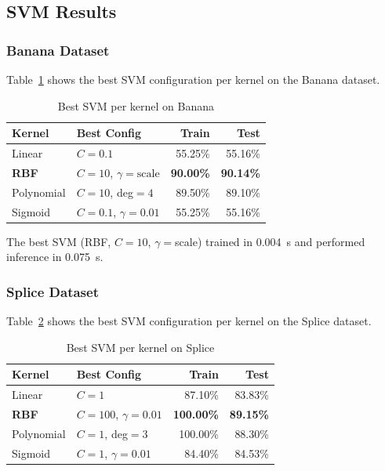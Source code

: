 \documentclass{acm_proc_article-sp}
\begin{document}
\subsection{SVM Results}

\subsubsection{Banana Dataset}
Table~\ref{tab:banana-svm} shows the best SVM configuration per kernel on the Banana dataset.

\begin{table}[H]
\centering
\caption{Best SVM per kernel on Banana}
\label{tab:banana-svm}
\begin{tabular}{l l r r}
\toprule
\textbf{Kernel} & \textbf{Best Config} & \textbf{Train} & \textbf{Test} \\
\midrule
Linear     & $C\!=\!0.1$             & 55.25\% & 55.16\% \\
\textbf{RBF} & $C\!=\!10$, $\gamma\!=\!\text{scale}$ & \textbf{90.00\%} & \textbf{90.14\%} \\
Polynomial & $C\!=\!10$, deg$\!=\!4$ & 89.50\% & 89.10\% \\
Sigmoid    & $C\!=\!0.1$, $\gamma\!=\!0.01$ & 55.25\% & 55.16\% \\
\bottomrule
\end{tabular}
\end{table}

The best SVM (RBF, $C=10$, $\gamma=$scale) trained in 0.004~s and performed inference in 0.075~s.

\subsubsection{Splice Dataset}
Table~\ref{tab:splice-svm} shows the best SVM configuration per kernel on the Splice dataset.

\begin{table}[H]
\centering
\caption{Best SVM per kernel on Splice}
\label{tab:splice-svm}
\begin{tabular}{l l r r}
\toprule
\textbf{Kernel} & \textbf{Best Config} & \textbf{Train} & \textbf{Test} \\
\midrule
Linear     & $C\!=\!1$                      & 87.10\% & 83.83\% \\
\textbf{RBF} & $C\!=\!100$, $\gamma\!=\!0.01$ & \textbf{100.00\%} & \textbf{89.15\%} \\
Polynomial & $C\!=\!1$, deg$\!=\!3$         & 100.00\% & 88.30\% \\
Sigmoid    & $C\!=\!1$, $\gamma\!=\!0.01$   & 84.40\% & 84.53\% \\
\bottomrule
\end{tabular}
\end{table}
\end{document}
